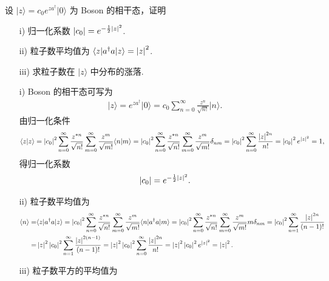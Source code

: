 \documentclass{assignment}
\begin{document}
\begin{prob}
    设 $\lvert z\rangle=c_0e^{za^{\dagger}}\lvert 0\rangle$ 为 Boson 的相干态，证明
    \begin{itemize}
        \item[i)] 归一化系数 $\left\lvert c_0\right\rvert=e^{-\frac{1}{2}\left\lvert z\right\rvert^2}$.
        \item[ii)] 粒子数平均值为 $\langle z\rvert a^{\dagger}a\lvert z\rangle=\left\lvert z\right\rvert^2$.
        \item[iii)] 求粒子数在 $\lvert z\rangle$ 中分布的涨落.
    \end{itemize}
\end{prob}
\begin{pf}
    \begin{itemize}
        \item[i)] Boson 的相干态可写为
        \begin{align}
            \lvert z\rangle=e^{za^{\dagger}}\lvert 0\rangle=c_0\sum_{n=0}^{\infty}\frac{z^n}{\sqrt{n!}}\lvert n\rangle.
        \end{align}
        由归一化条件
        \begin{align}
            \langle z\vert z\rangle=\left\lvert c_0\right\rvert^2\sum_{n=0}^{\infty}\frac{z^{*n}}{\sqrt{n!}}\sum_{m=0}^{\infty}\frac{z^m}{\sqrt{m!}}\langle n\vert m\rangle=\left\lvert c_0\right\rvert^2\sum_{n=0}^{\infty}\frac{z^{*n}}{\sqrt{n!}}\sum_{m=0}^{\infty}\frac{z^m}{\sqrt{m!}}\delta_{nm}=\left\lvert c_0\right\rvert^2\sum_{n=0}^{\infty}\frac{\left\lvert z\right\rvert^{2n}}{n!}=\left\lvert c_0\right\rvert^2e^{\left\lvert z\right\rvert^2}=1,
        \end{align}
        得归一化系数
        \begin{align}
            \left\lvert c_0\right\rvert=e^{-\frac{1}{2}\left\lvert z\right\rvert^2}.
        \end{align}
        \item[ii)] 粒子数平均值为
        \begin{align}
            \notag\langle n\rangle=&\langle z\rvert a^{\dagger}a\lvert z\rangle=\left\lvert c_0\right\rvert^2\sum_{n=0}^{\infty}\frac{z^{*n}}{\sqrt{n!}}\sum_{m=0}^{\infty}\frac{z^m}{\sqrt{m!}}\langle n\rvert a^{\dagger}a\lvert m\rangle=\left\lvert c_0\right\rvert^2\sum_{n=0}^{\infty}\frac{z^{*n}}{\sqrt{n!}}\sum_{m=0}^{\infty}\frac{z^m}{\sqrt{m!}}m\delta_{nm}=\left\lvert c_0\right\rvert^2\sum_{n=1}^{\infty}\frac{\left\lvert z\right\rvert^{2n}}{(n-1)!}\\
            =&\left\lvert z\right\rvert^2\left\lvert c_0\right\rvert^2\sum_{n=1}^{\infty}\frac{\left\lvert z\right\rvert^{2(n-1)}}{(n-1)!}=\left\lvert z\right\rvert^2\left\lvert c_0\right\rvert^2\sum_{n=0}^{\infty}\frac{\left\lvert z\right\rvert^{2n}}{n!}=\left\lvert z\right\rvert^2\left\lvert c_0\right\rvert^2e^{\left\lvert z\right\rvert^2}=\left\lvert z\right\rvert^2.
        \end{align}
        \item[iii)] 粒子数平方的平均值为

\end{itemize}
\end{pf}
\end{document}
